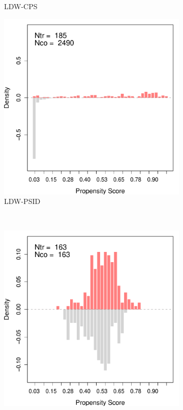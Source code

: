 \documentclass[letterpaper,12pt,leqno]{article}
\begin{document}
\begin{figure}[!ht]
\begin{minipage}[c]{.65\textwidth}
\begin{subfigure}{0.45\linewidth}
            \caption{LDW-CPS}
        \end{subfigure}
        \begin{subfigure}{0.45\linewidth}
            \includegraphics[width=\linewidth]{ps_ldw_psid.pdf}
            \caption{LDW-PSID}
        \end{subfigure}\\
        \begin{subfigure}{0.45\linewidth}
            \includegraphics[width=\linewidth]{ps_ldw_cps_trim.pdf}

\end{subfigure}
\end{minipage}
\end{figure}
\end{document}
